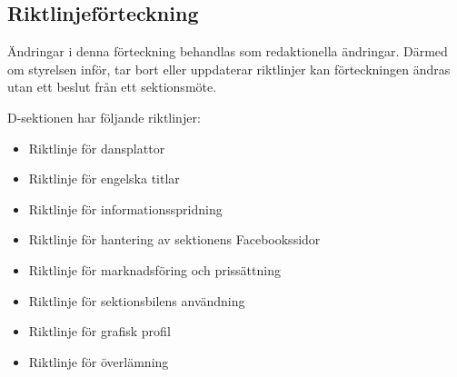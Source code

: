 \documentclass[]{dsekprotokoll}
\begin{document}
\subsection{Riktlinjeförteckning}
Ändringar i denna förteckning behandlas som redaktionella ändringar. Därmed om styrelsen inför, tar bort eller uppdaterar riktlinjer kan förteckningen ändras utan ett beslut från ett sektionsmöte.

D-sektionen har följande riktlinjer:
\begin{itemize}
    \item Riktlinje för dansplattor
    \item Riktlinje för engelska titlar
    \item Riktlinje för informationsspridning
    \item Riktlinje för hantering av sektionens Facebookssidor
    \item Riktlinje för marknadsföring och prissättning
    \item Riktlinje för sektionsbilens användning
    \item Riktlinje för grafisk profil
    \item Riktlinje för överlämning   
    \end{itemize}
\end{document}

